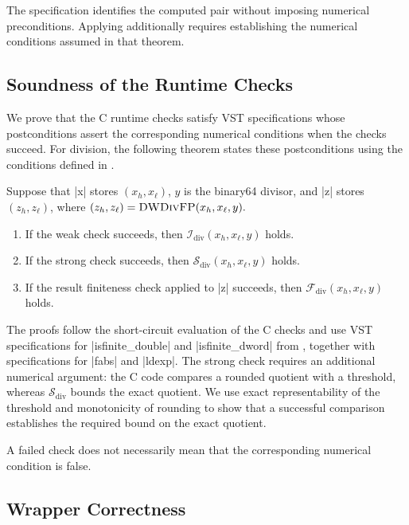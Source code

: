 The specification identifies the computed pair without imposing
numerical preconditions. Applying
 additionally requires establishing
the numerical conditions assumed in that theorem.

\subsection{Soundness of the Runtime Checks}
\label{sec:check-soundness}

We prove that the C runtime checks satisfy VST specifications
whose postconditions assert the corresponding numerical conditions
when the checks succeed. For division, the following theorem states
these postconditions using the conditions defined in
.

\begin{theorem}
\label{thm:division-checks}
Suppose that \ccode|x| stores $(x_h,x_\ell)$, $y$ is the binary64
divisor, and \ccode|z| stores $(z_h,z_\ell)$, where
$
  (z_h,z_\ell)=\textsc{DWDivFP}(x_h,x_\ell,y).
$
\begin{enumerate}
  \item If the weak check succeeds, then
    $\mathcal{I}_{\mathrm{div}}(x_h,x_\ell,y)$ holds.
  \item If the strong check succeeds, then
    $\mathcal{S}_{\mathrm{div}}(x_h,x_\ell,y)$ holds.
  \item If the result finiteness check applied to \ccode|z|
    succeeds, then $\mathcal{F}_{\mathrm{div}}(x_h,x_\ell,y)$ holds.
\end{enumerate}
\end{theorem}

The proofs follow the short-circuit evaluation of the C checks
and use VST specifications for \ccode|isfinite_double| and
\ccode|isfinite_dword| from , together
with specifications for \ccode|fabs| and \ccode|ldexp|. 
The strong check requires an
additional numerical argument: the C code compares a rounded
quotient with a threshold, whereas
$\mathcal{S}_{\mathrm{div}}$ bounds the exact quotient.
We use exact representability of the threshold and monotonicity
of rounding to show that a successful comparison establishes
the required bound on the exact quotient.

A failed check does not necessarily mean that the corresponding
numerical condition is false.

\subsection{Wrapper Correctness}
\label{sec:division-wrapper-contracts}

